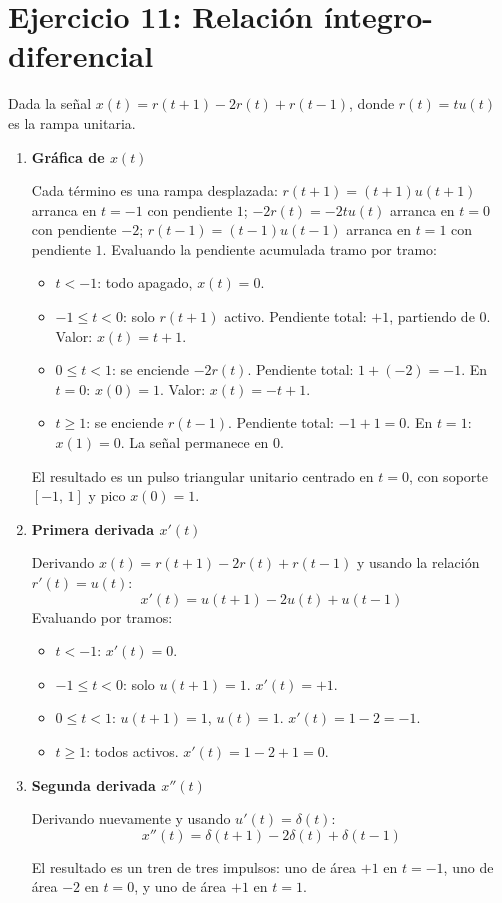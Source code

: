 \documentclass[10pt,a4paper]{article}
\begin{document}
	\section*{Ejercicio 11: Relación íntegro-diferencial}
	
	Dada la señal $x(t) = r(t+1) - 2r(t) + r(t-1)$, donde $r(t) = tu(t)$ es la rampa unitaria.
	
	\begin{enumerate}[label=\textbf{\alph*)}]
		\item \textbf{Gráfica de $x(t)$}
		
		Cada término es una rampa desplazada: $r(t+1)=(t+1)u(t+1)$ arranca en $t=-1$ con pendiente $1$; $-2r(t) = -2tu(t)$ arranca en $t=0$ con pendiente $-2$; $r(t-1)=(t-1)u(t-1)$ arranca en $t=1$ con pendiente $1$. Evaluando la pendiente acumulada tramo por tramo:
		\begin{itemize}
		    \item $t<-1$: todo apagado, $x(t)=0$.
		    \item $-1\leq t<0$: solo $r(t+1)$ activo. Pendiente total: $+1$, partiendo de $0$. Valor: $x(t) = t+1$.
		    \item $0\leq t<1$: se enciende $-2r(t)$. Pendiente total: $1+(-2)=-1$. En $t=0$: $x(0)=1$. Valor: $x(t) = -t+1$.
		    \item $t\geq 1$: se enciende $r(t-1)$. Pendiente total: $-1+1=0$. En $t=1$: $x(1)=0$. La señal permanece en $0$.
		\end{itemize}
		
		El resultado es un pulso triangular unitario centrado en $t=0$, con soporte $[-1,\, 1]$ y pico $x(0)=1$.
		
		\item \textbf{Primera derivada $x'(t)$}
		
		Derivando $x(t) = r(t+1) - 2r(t) + r(t-1)$ y usando la relación $r'(t) = u(t)$:
		\[
		x'(t) = u(t+1) - 2u(t) + u(t-1)
		\]
		Evaluando por tramos:
		\begin{itemize}
		    \item $t<-1$: $x'(t)=0$.
		    \item $-1\leq t<0$: solo $u(t+1)=1$. $x'(t)=+1$.
		    \item $0\leq t<1$: $u(t+1)=1$, $u(t)=1$. $x'(t)=1-2=-1$.
		    \item $t\geq 1$: todos activos. $x'(t)=1-2+1=0$.
		\end{itemize}
		
		\item \textbf{Segunda derivada $x''(t)$}
		
		Derivando nuevamente y usando $u'(t) = \delta(t)$:
		\[
		x''(t) = \delta(t+1) - 2\delta(t) + \delta(t-1)
		\]
		
		El resultado es un tren de tres impulsos: uno de área $+1$ en $t=-1$, uno de área $-2$ en $t=0$, y uno de área $+1$ en $t=1$.
	\end{enumerate}
	
\end{document}
